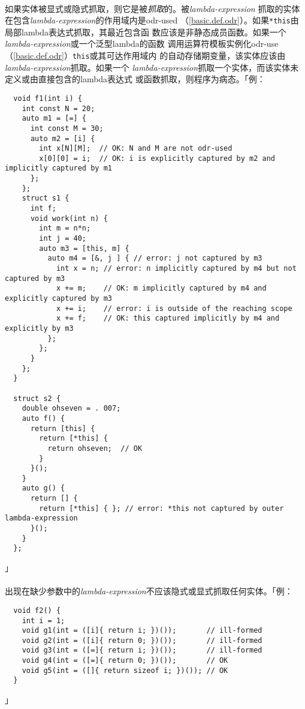 \paragraph{}
如果实体被显式或隐式抓取，则它是被\textit{抓取}的。被\textit{lambda-expression}
抓取的实体在包含\textit{lambda-expression}的作用域内是odr-used
（\ref{basic.def.odr}）。如果\texttt{*this}由局部lambda表达式抓取，其最近包含函
数应该是非静态成员函数。如果一个\textit{lambda-expression}或一个泛型lambda的函数
调用运算符模板实例化odr-use（\ref{basic.def.odr}）\texttt{this}或其可达作用域内
的自动存储期变量，该实体应该由\textit{lambda-expression}抓取。如果一个
\textit{lambda-expression}抓取一个实体，而该实体未定义或由直接包含的lambda表达式
或函数抓取，则程序为病态。「例：
\begin{lstlisting}
  void f1(int i) {
    int const N = 20;
    auto m1 = [=] {
      int const M = 30;
      auto m2 = [i] {
        int x[N][M];  // OK: N and M are not odr-used
        x[0][0] = i;  // OK: i is explicitly captured by m2 and implicitly captured by m1
      };
    };
    struct s1 {
      int f;
      void work(int n) {
        int m = n*n;
        int j = 40;
        auto m3 = [this, m] {
          auto m4 = [&, j ] { // error: j not captured by m3
            int x = n; // error: n implicitly captured by m4 but not captured by m3
            x += m;    // OK: m implicitly captured by m4 and explicitly captured by m3
            x += i;    // error: i is outside of the reaching scope
            x += f;    // OK: this captured implicitly by m4 and explicitly by m3
          };
        };
      }
    };
  }

  struct s2 {
    double ohseven = . 007;
    auto f() {
      return [this] {
        return [*this] {
          return ohseven;  // OK
        }
      }();
    }
    auto g() {
      return [] {
        return [*this] { }; // error: *this not captured by outer lambda-expression
      }();
    }
  };
\end{lstlisting}」

\paragraph{}
出现在缺少参数中的\textit{lambda-expression}不应该隐式或显式抓取任何实体。「例：
\begin{lstlisting}
  void f2() {
    int i = 1;
    void g1(int = ([i]{ return i; })());       // ill-formed
    void g2(int = ([i]{ return 0; })());       // ill-formed
    void g3(int = ([=]{ return i; })());       // ill-formed
    void g4(int = ([=]{ return 0; })());       // OK
    void g5(int = ([]{ return sizeof i; })()); // OK
  }
\end{lstlisting}」

